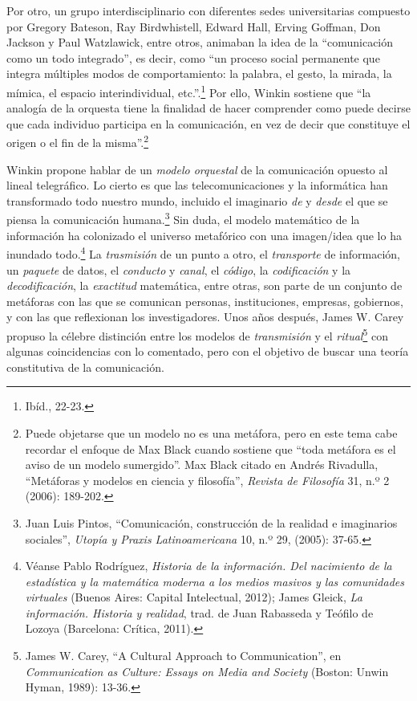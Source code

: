 \documentclass{tufte-handout}
\begin{document}
Por otro, un grupo interdisciplinario con diferentes sedes
universitarias compuesto por Gregory Bateson, Ray Birdwhistell, Edward
Hall, Erving Goffman, Don Jackson y Paul Watzlawick, entre otros,
animaban la idea de la ``comunicación como un todo integrado'', es
decir, como ``un proceso social permanente que integra múltiples modos
de comportamiento: la palabra, el gesto, la mirada, la mímica, el
espacio interindividual, etc.''.\footnote{Ibíd., 22-23.} Por ello,
Winkin sostiene que ``la analogía de la orquesta tiene la finalidad de
hacer comprender como puede decirse que cada individuo participa en la
comunicación, en vez de decir que constituye el origen o el fin de la
misma''.\footnote{Puede objetarse que un modelo no es una metáfora, pero
  en este tema cabe recordar el enfoque de Max Black cuando sostiene que
  ``toda metáfora es el aviso de un modelo sumergido''. Max Black citado
  en Andrés Rivadulla, ``Metáforas y modelos en ciencia y filosofía'',
  \emph{Revista de Filosofía} 31, n.º 2 (2006): 189-202.}

Winkin propone hablar de un \emph{modelo orquestal} de la comunicación
opuesto al lineal telegráfico. Lo cierto es que las telecomunicaciones y
la informática han transformado todo nuestro mundo, incluido el
imaginario \emph{de} y \emph{desde} el que se piensa la comunicación
humana.\footnote{Juan Luis Pintos, ``Comunicación, construcción de la
  realidad e imaginarios sociales'', \emph{Utopía y Praxis
  Latinoamericana} 10, n.º 29, (2005): 37-65.} Sin duda, el modelo
matemático de la información ha colonizado el universo metafórico con
una imagen/idea que lo ha inundado todo.\footnote{Véanse Pablo
  Rodríguez, \emph{Historia de la información. Del nacimiento de la
  estadística y la matemática moderna a los medios masivos y las
  comunidades virtuales} (Buenos Aires: Capital Intelectual, 2012);
  James Gleick, \emph{La información. Historia y realidad}, trad. de
  Juan Rabasseda y Teófilo de Lozoya (Barcelona: Crítica, 2011).} La
\emph{trasmisión} de un punto a otro, el \emph{transporte} de
información, un \emph{paquete} de datos, el \emph{conducto} y
\emph{canal}, el \emph{código}, la \emph{codificación} y la
\emph{decodificación}, la \emph{exactitud} matemática, entre otras, son
parte de un conjunto de metáforas con las que se comunican personas,
instituciones, empresas, gobiernos, y con las que reflexionan los
investigadores. Unos años después, James W. Carey propuso la célebre
distinción entre los modelos de \emph{transmisión} y el
\emph{ritual}\footnote{James W. Carey, ``A Cultural Approach to
  Communication'', en \emph{Communication as Culture: Essays on Media
  and Society} (Boston: Unwin Hyman, 1989): 13-36.} con algunas
coincidencias con lo comentado, pero con el objetivo de buscar una
teoría constitutiva de la comunicación.
\end{document}
